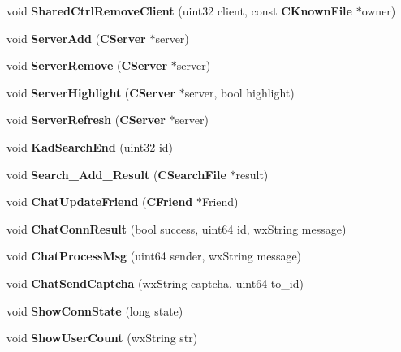 \begin{DoxyCompactItemize}
\item 
void {\bfseries SharedCtrlRemoveClient} (uint32 client, const {\bf CKnownFile} $\ast$owner)\label{namespaceMuleNotify_a75b61f0f4d623144ebe1afcffea48b4e}

\item 
void {\bfseries ServerAdd} ({\bf CServer} $\ast$server)\label{namespaceMuleNotify_a54b577e8dd1209fdf0f36469dc167a84}

\item 
void {\bfseries ServerRemove} ({\bf CServer} $\ast$server)\label{namespaceMuleNotify_a3cb5d64e2ed60d2f1e3cca36df91bebd}

\item 
void {\bfseries ServerHighlight} ({\bf CServer} $\ast$server, bool highlight)\label{namespaceMuleNotify_a2f4425a4074f854dc67a1a42b88180e4}

\item 
void {\bfseries ServerRefresh} ({\bf CServer} $\ast$server)\label{namespaceMuleNotify_a5a8a32bbdc0fa2be91006b8963db523d}

\item 
void {\bfseries KadSearchEnd} (uint32 id)\label{namespaceMuleNotify_a9eaca741f86d56bb6a66544d53982df0}

\item 
void {\bfseries Search\_\-Add\_\-Result} ({\bf CSearchFile} $\ast$result)\label{namespaceMuleNotify_ac975085da5f6e67c3b989c943e54a1d7}

\item 
void {\bfseries ChatUpdateFriend} ({\bf CFriend} $\ast$Friend)\label{namespaceMuleNotify_a698fd0f9661e21617046850e95b7fa67}

\item 
void {\bfseries ChatConnResult} (bool success, uint64 id, wxString message)\label{namespaceMuleNotify_a719c62c68170b74dc277c2b2b6c92c50}

\item 
void {\bfseries ChatProcessMsg} (uint64 sender, wxString message)\label{namespaceMuleNotify_ab90ecd4d19942941e506c3bdb76f5ad4}

\item 
void {\bfseries ChatSendCaptcha} (wxString captcha, uint64 to\_\-id)\label{namespaceMuleNotify_a662a101bb6847c39306bede9f67d4290}

\item 
void {\bfseries ShowConnState} (long state)\label{namespaceMuleNotify_a6c6c1f013d8a0924db5f9a01f516967f}

\item 
void {\bfseries ShowUserCount} (wxString str)\label{namespaceMuleNotify_a5dfadc8a7cbe2b00d5cf90c923de8d8c}


\end{DoxyCompactItemize}
